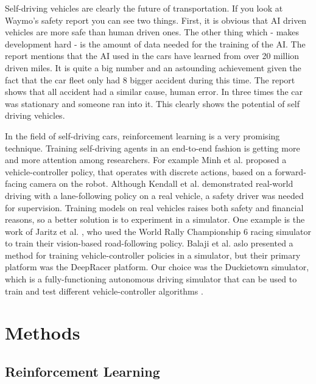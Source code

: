 \documentclass{article}
\begin{document}
Self-driving vehicles are clearly the future of transportation. If you look at Waymo's \cite{waymo}  safety report you can see two things. First, it is obvious that AI driven vehicles are more safe than human driven ones. The other thing which - makes development hard - is the amount of data needed for the training of the AI. 
The report mentions that the AI used in the cars have learned from over 20 million driven miles. It is quite a big number and an astounding achievement given the fact that the car fleet only had 8 bigger accident during this time. The report shows that all accident had a similar cause, human error. In three times the car was stationary and someone ran into it. This clearly shows the potential of self driving vehicles.

In the field of self-driving cars, reinforcement learning is a very promising technique. Training self-driving agents in an end-to-end fashion is getting more and more attention among researchers. For example Minh et al. \cite{DBLP:journals/corr/MnihBMGLHSK16} proposed a vehicle-controller policy, that operates with discrete actions, based on a forward-facing camera on the robot. Although Kendall et al. \cite{kendall2018learning} demonstrated real-world driving with a lane-following policy on a real vehicle, a safety driver was needed for supervision. 
Training models on real vehicles raises both safety and financial reasons, so a better solution is to experiment in a simulator. One example is the work of Jaritz et al. \cite{DBLP:journals/corr/abs-1807-02371}, who used the World Rally Championship 6 racing simulator to train their vision-based road-following policy. Balaji et al. \cite{DBLP:journals/corr/abs-1911-01562} aslo presented a method for training vehicle-controller policies in a simulator, but their primary platform was the DeepRacer platform. Our choice was the Duckietown simulator, which is a fully-functioning autonomous driving simulator that can be used to train and test different vehicle-controller algorithms \cite{gymdt}.

\section{\large{Methods}}

\subsection{\normalsize{Reinforcement Learning}}
\end{document}
